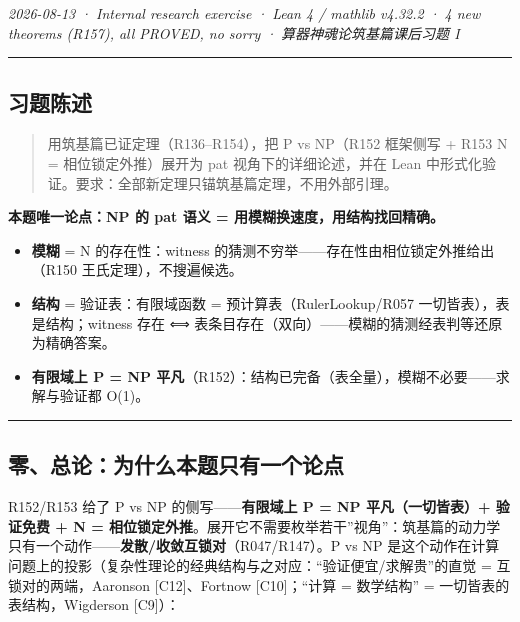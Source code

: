 \documentclass[
]{article}
\providecommand{\tightlist}{%
  \setlength{\itemsep}{0pt}\setlength{\parskip}{0pt}}
\begin{document}
\emph{2026-08-13 · Internal research exercise · Lean 4 / mathlib v4.32.2
· 4 new theorems (R157), all PROVED, no sorry · 算器神魂论筑基篇课后习题
I }

\begin{center}\rule{0.5\linewidth}{0.5pt}\end{center}

\subsection{习题陈述}\label{ux4e60ux9898ux9648ux8ff0}

\begin{quote}
用筑基篇已证定理（R136--R154），把 P vs NP（R152 框架侧写 + R153 N =
相位锁定外推）展开为 pat 视角下的详细论述，并在 Lean
中形式化验证。要求：全部新定理只锚筑基篇定理，不用外部引理。
\end{quote}

\textbf{本题唯一论点：NP 的 pat 语义 = 用模糊换速度，用结构找回精确。}

\begin{itemize}
\tightlist
\item
  \textbf{模糊} = N 的存在性：witness
  的猜测不穷举------存在性由相位锁定外推给出（R150
  王氏定理），不搜遍候选。
\item
  \textbf{结构} = 验证表：有限域函数 = 预计算表（RulerLookup/R057
  一切皆表），表是结构；witness 存在 ⟺
  表条目存在（双向）------模糊的猜测经表判等还原为精确答案。
\item
  \textbf{有限域上 P = NP
  平凡}（R152）：结构已完备（表全量），模糊不必要------求解与验证都
  O(1)。
\end{itemize}

\begin{center}\rule{0.5\linewidth}{0.5pt}\end{center}

\subsection{零、总论：为什么本题只有一个论点}\label{ux96f6ux603bux8bbaux4e3aux4ec0ux4e48ux672cux9898ux53eaux6709ux4e00ux4e2aux8bbaux70b9}

R152/R153 给了 P vs NP 的侧写------\textbf{有限域上 P = NP
平凡（一切皆表）+ 验证免费 + N =
相位锁定外推}。展开它不需要枚举若干''视角''：筑基篇的动力学只有一个动作------\textbf{发散/收敛互锁对}（R047/R147）。P
vs NP
是这个动作在计算问题上的投影（复杂性理论的经典结构与之对应：``验证便宜/求解贵''的直觉
= 互锁对的两端，Aaronson {[}C12{]}、Fortnow {[}C10{]}；``计算 =
数学结构'' = 一切皆表的表结构，Wigderson {[}C9{]}）：
\end{document}
